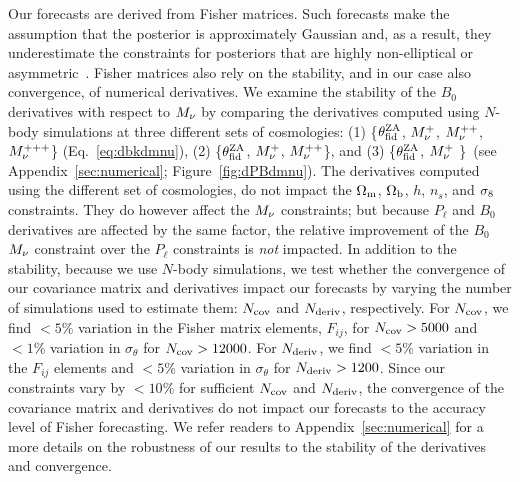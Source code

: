 Our forecasts are derived from Fisher matrices. Such forecasts make 
the assumption that the posterior is approximately Gaussian and, as a result, 
they underestimate the constraints for posteriors that are highly 
non-elliptical or asymmetric~\citep{wolz2012}. Fisher matrices also rely 
on the stability, and in our case also convergence, of numerical derivatives. 
We examine the stability of the $B_0$ derivatives with respect to $M_\nu$ 
by comparing the derivatives computed using $N$-body simulations 
at three different sets of cosmologies: (1) \{$\theta_{\rm fid}^{\rm ZA}$, $M_\nu^{+}$, $M_\nu^{++}$, 
$M_\nu^{+++}$\} (Eq.~\ref{eq:dbkdmnu}), (2) \{$\theta_{\rm fid}^{\rm ZA}$, $M_\nu^{+}$, 
$M_\nu^{++}$\}, and (3) \{$\theta_{\rm fid}^{\rm ZA}$, $M_\nu^{+}$ \}~(see Appendix~\ref{sec:numerical}; Figure~\ref{fig:dPBdmnu}). 
The derivatives computed using the different set of cosmologies, do not impact 
the $\Omega_{\rm m}$, $\Omega_{\rm b}$, $h$, $n_s$, and $\sigma_8$ constraints. They do however affect the 
$M_\nu$ constraints; but because $P_\ell$ and $B_0$ derivatives are affected by 
the same factor, the relative improvement of the $B_0$ $M_\nu$ constraint over 
the $P_\ell$ constraints is \emph{not} impacted. 
In addition to the stability, because we use $N$-body simulations, we test 
whether the convergence of our covariance matrix and derivatives impact 
our forecasts by varying the number of simulations 
used to estimate them: $N_{\rm cov}$ and $N_{\rm deriv}$, respectively. 
For $N_{\rm cov}$, we find $< 5\%$ variation in the Fisher matrix elements, 
$F_{ij}$, for $N_{\rm cov} > 5000$ and $< 1\%$ variation in $\sigma_\theta$
for $N_{\rm cov} > 12000$.  For $N_{\rm deriv}$, we find $< 5\%$ variation 
in the $F_{ij}$ elements and $< 5\%$ variation in $\sigma_\theta$ for 
$N_{\rm deriv} > 1200$. Since our constraints vary by $< 10\%$ for sufficient 
$N_{\rm cov}$ and $N_{\rm deriv}$, the convergence of the covariance matrix 
and derivatives do not impact our forecasts to the accuracy level of Fisher 
forecasting. We refer readers to Appendix~\ref{sec:numerical} for a more 
details on the robustness of our results to the stability of the derivatives 
and convergence. 

